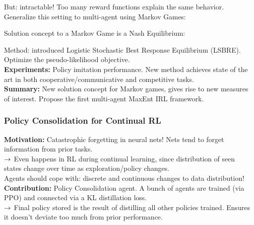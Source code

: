 
But: intractable! Too many reward functions explain the same behavior. \\

Generalize this setting to multi-agent using Markov Games:


Solution concept to a Markov Game is a Nash Equilibrium:

Method: introduced Logistic Stochastic Best Response Equilibrium (LSBRE). Optimize the pseudo-likelihood objective. \\

{\bf Experiments:} Policy imitation performance. New method achieves state of the art in both cooperative/communicative and competitive tasks. \\

{\bf Summary:} New solution concept for Markov games, gives rise to new measures of interest. Propose the first multi-agent MaxEnt IRL framework.

\spacerule

\subsubsection{Policy Consolidation for Continual RL~\cite{kaplanis2019policy}}

{\bf Motivation:} Catastrophic forgetting in neural nets! Nets tend to forget information from prior tasks. \\

$\rightarrow$ Even happens in RL during continual learning, since distribution of seen states change over time as exploration/policy changes. \\

Agents should cope with: discrete and continuous changes to data distribution! \\

{\bf Contribution:} Policy Consolidation agent. A bunch of agents are trained (via PPO) and connected via a KL distillation loss. \\

$\rightarrow$ Final policy stored is the result of distilling all other policies trained. Ensures it doesn't deviate too much from prior performance. \\

